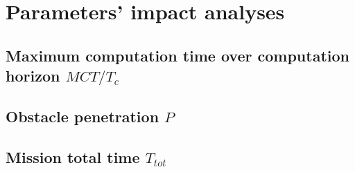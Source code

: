 \documentclass[eprint]{actapoly}
\begin{document}
\section{Parameters' impact analyses}





\subsection{Maximum computation time over computation horizon $MCT/T_c$}



\subsection{Obstacle penetration $P$}



\subsection{Mission total time $T_{tot}$}



%
%
%
%
\end{document}
